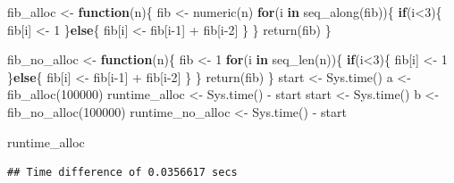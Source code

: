 \documentclass[
]{book}
\newenvironment{Shaded}{\begin{snugshade}}{\end{snugshade}}
\newcommand{\ControlFlowTok}[1]{\textcolor[rgb]{0.13,0.29,0.53}{\textbf{#1}}}
\newcommand{\DecValTok}[1]{\textcolor[rgb]{0.00,0.00,0.81}{#1}}
\newcommand{\FunctionTok}[1]{\textcolor[rgb]{0.00,0.00,0.00}{#1}}
\newcommand{\NormalTok}[1]{#1}
\newcommand{\OtherTok}[1]{\textcolor[rgb]{0.56,0.35,0.01}{#1}}
\newcommand{\SpecialCharTok}[1]{\textcolor[rgb]{0.00,0.00,0.00}{#1}}
\begin{document}
\begin{Shaded}
\begin{Highlighting}[]
\NormalTok{fib\_alloc }\OtherTok{\textless{}{-}} \ControlFlowTok{function}\NormalTok{(n)\{}
\NormalTok{  fib }\OtherTok{\textless{}{-}} \FunctionTok{numeric}\NormalTok{(n)}
  \ControlFlowTok{for}\NormalTok{(i }\ControlFlowTok{in} \FunctionTok{seq\_along}\NormalTok{(fib))\{}
    \ControlFlowTok{if}\NormalTok{(i}\SpecialCharTok{\textless{}}\DecValTok{3}\NormalTok{)\{ }
\NormalTok{      fib[i] }\OtherTok{\textless{}{-}} \DecValTok{1}
\NormalTok{    \}}\ControlFlowTok{else}\NormalTok{\{}
\NormalTok{      fib[i] }\OtherTok{\textless{}{-}}\NormalTok{ fib[i}\DecValTok{{-}1}\NormalTok{] }\SpecialCharTok{+}\NormalTok{ fib[i}\DecValTok{{-}2}\NormalTok{] }
\NormalTok{    \}}
\NormalTok{  \}}
  \FunctionTok{return}\NormalTok{(fib)}
\NormalTok{\}}


\NormalTok{fib\_no\_alloc }\OtherTok{\textless{}{-}} \ControlFlowTok{function}\NormalTok{(n)\{}
\NormalTok{  fib }\OtherTok{\textless{}{-}} \DecValTok{1}
  \ControlFlowTok{for}\NormalTok{(i }\ControlFlowTok{in} \FunctionTok{seq\_len}\NormalTok{(n))\{}
    \ControlFlowTok{if}\NormalTok{(i}\SpecialCharTok{\textless{}}\DecValTok{3}\NormalTok{)\{ }
\NormalTok{      fib[i] }\OtherTok{\textless{}{-}} \DecValTok{1}
\NormalTok{    \}}\ControlFlowTok{else}\NormalTok{\{}
\NormalTok{      fib[i] }\OtherTok{\textless{}{-}}\NormalTok{ fib[i}\DecValTok{{-}1}\NormalTok{] }\SpecialCharTok{+}\NormalTok{ fib[i}\DecValTok{{-}2}\NormalTok{] }
\NormalTok{    \}}
\NormalTok{  \}}
  \FunctionTok{return}\NormalTok{(fib)}
\NormalTok{\}}
\NormalTok{start }\OtherTok{\textless{}{-}} \FunctionTok{Sys.time}\NormalTok{()}
\NormalTok{a }\OtherTok{\textless{}{-}} \FunctionTok{fib\_alloc}\NormalTok{(}\DecValTok{100000}\NormalTok{)}
\NormalTok{runtime\_alloc }\OtherTok{\textless{}{-}} \FunctionTok{Sys.time}\NormalTok{() }\SpecialCharTok{{-}}\NormalTok{ start}
\NormalTok{start }\OtherTok{\textless{}{-}} \FunctionTok{Sys.time}\NormalTok{()}
\NormalTok{b }\OtherTok{\textless{}{-}} \FunctionTok{fib\_no\_alloc}\NormalTok{(}\DecValTok{100000}\NormalTok{)}
\NormalTok{runtime\_no\_alloc }\OtherTok{\textless{}{-}} \FunctionTok{Sys.time}\NormalTok{() }\SpecialCharTok{{-}}\NormalTok{ start}

\NormalTok{runtime\_alloc}
\end{Highlighting}
\end{Shaded}

\begin{verbatim}
## Time difference of 0.0356617 secs
\end{verbatim}
\end{document}
